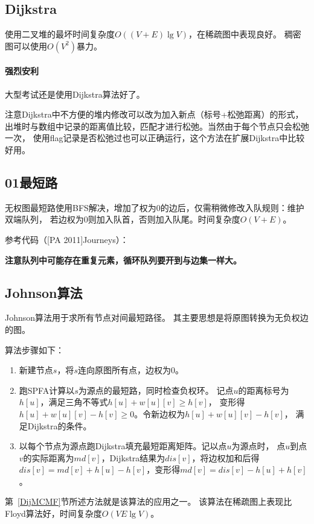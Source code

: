 \subsection{Dijkstra}
使用二叉堆的最坏时间复杂度$O((V+E)\lg V)$，在稀疏图中表现良好。
稠密图可以使用$O(V^2)$暴力。
\paragraph{强烈安利}
大型考试还是使用Dijkstra算法好了。

注意Dijkstra中不方便的堆内修改可以改为加入新点（标号+松弛距离）的形式，
出堆时与数组中记录的距离值比较，匹配才进行松弛。当然由于每个节点只会松弛一次，
使用flag记录是否松弛过也可以正确运行，这个方法在扩展Dijkstra中比较好用。
\subsection{01最短路}
无权图最短路使用BFS解决，增加了权为0的边后，仅需稍微修改入队规则：维护双端队列，
若边权为0则加入队首，否则加入队尾。时间复杂度$O(V+E)$。

参考代码（[PA 2011]Journeys）：


{\bfseries 注意队列中可能存在重复元素，循环队列要开到与边集一样大。}
\subsection{Johnson算法}
Johnson算法用于求所有节点对间最短路径。
其主要思想是将原图转换为无负权边的图。

算法步骤如下：
\begin{enumerate}
    \item 新建节点$s$，将$s$连向原图所有点，边权为0。
    \item 跑SPFA计算以$s$为源点的最短路，同时检查负权环。
    记点$u$的距离标号为$h[u]$，满足三角不等式$h[u]+w[u][v]\geq h[v]$，
    变形得$h[u]+w[u][v]-h[v]\geq 0$。令新边权为$h[u]+w[u][v]-h[v]$，
    满足Dijkstra的条件。
    \item 以每个节点为源点跑Dijkstra填充最短距离矩阵。记以点$u$为源点时，
    点$u$到点$v$的实际距离为$md[v]$，Dijkstra结果为$dis[v]$，将边权加和后得
    $dis[v]=md[v]+h[u]-h[v]$，变形得$md[v]=dis[v]-h[u]+h[v]$。
\end{enumerate}

第~\ref{DijMCMF}节所述方法就是该算法的应用之一。
该算法在稀疏图上表现比Floyd算法好，时间复杂度$O(VE\lg V)$。
